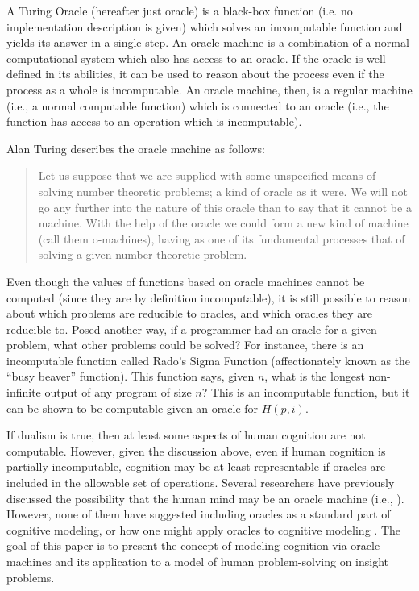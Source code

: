 A Turing Oracle (hereafter just oracle) is a black-box function (i.e. no implementation description is given) which solves an incomputable function and yields its answer in a single step.  An oracle machine is a combination of a normal computational system which also has access to an oracle.  If the oracle is well-defined in its abilities, it can be used to reason about the process even if the process as a whole is incomputable.  An oracle machine, then, is a regular machine (i.e., a normal computable function) which is connected to an oracle (i.e., the function has access to an operation which is incomputable).

Alan Turing describes the oracle machine as follows:

\begin{quote}
Let us suppose that we are supplied with some unspecified means of solving number theoretic problems; a kind of oracle as it were.  We will not go any further into the nature of this oracle than to say that it cannot be a machine.  With the help of the oracle we could form a new kind of machine (call them o-machines), having as one of its fundamental processes that of solving a given number theoretic problem. \citep[][\S{}4]{turing1939}
\end{quote}

Even though the values of functions based on oracle machines cannot be computed (since they are by definition incomputable), it is still possible to reason about which problems are reducible to oracles, and which oracles they are reducible to.  Posed another way, if a programmer had an oracle for a given problem, what other problems could be solved?  For instance, there is an incomputable function called Rado's Sigma Function (affectionately known as the ``busy beaver'' function).  This function says, given $n$, what is the longest non-infinite output of any program of size $n$?  This is an incomputable function, but it can be shown to be computable given an oracle for $H(p, i)$.

If dualism is true, then at least some aspects of human cognition are not computable.  However, given the discussion above, even if human cognition is partially incomputable, cognition may be at least representable if oracles are included in the allowable set of operations.  Several researchers have previously discussed the possibility that the human mind may be an oracle machine (i.e., \citep{copeland1998}).  However, none of them have suggested including oracles as a standard part of cognitive modeling, or how one might apply oracles to cognitive modeling \citep{bartlett2010a, bartlett2010b}. The goal of this paper is to present the concept of modeling cognition via oracle machines and its application to a model of human problem-solving on insight problems.

